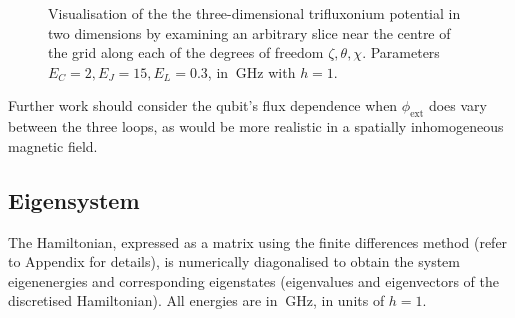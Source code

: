 \documentclass[11pt]{article}
\begin{document}
\begin{figure}[H]
	\centering
	\caption{Visualisation of the the three-dimensional trifluxonium potential in two dimensions by examining an arbitrary slice near the centre of the grid along each of the degrees of freedom $\zeta, \theta, \chi$. Parameters $E_C=2, E_J=15, E_L=0.3$, in $\SI{}{\giga\hertz}$ with $h=1$.}
	\label{triflux_potential}
\end{figure}

Further work should consider the qubit's flux dependence when $\phi_\text{ext}$ does vary between the three loops, as would be more realistic in a spatially inhomogeneous magnetic field.



\subsection{Eigensystem}

The Hamiltonian, expressed as a matrix using the finite differences method (refer to Appendix for details), is numerically diagonalised to obtain the system eigenenergies and corresponding eigenstates (eigenvalues and eigenvectors of the discretised Hamiltonian). All energies are in $\SI{}{\giga\hertz}$, in units of $h=1$.
\end{document}
